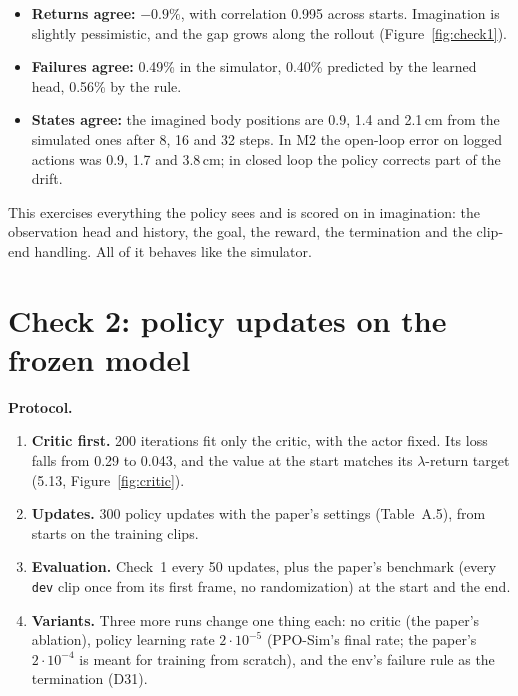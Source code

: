 \documentclass[10pt]{article}
\newcommand{\fig}[1]{Figure~\ref{#1}}
\begin{document}
\begin{itemize}
  \item \textbf{Returns agree:} $-0.9\%$, with correlation 0.995 across starts. Imagination is slightly
  pessimistic, and the gap grows along the rollout (\fig{fig:check1}).
  \item \textbf{Failures agree:} 0.49\% in the simulator, 0.40\% predicted by the learned head, 0.56\%
  by the rule.
  \item \textbf{States agree:} the imagined body positions are 0.9, 1.4 and 2.1\,cm from the simulated
  ones after 8, 16 and 32 steps. In M2 the open-loop error on logged actions was 0.9, 1.7 and 3.8\,cm;
  in closed loop the policy corrects part of the drift.
\end{itemize}

This exercises everything the policy sees and is scored on in imagination: the observation head
and history, the goal, the reward, the termination and the clip-end handling. All of it behaves like
the simulator.

\section{Check 2: policy updates on the frozen model}

\textbf{Protocol.}
\begin{enumerate}
  \item \textbf{Critic first.} 200 iterations fit only the critic, with the actor fixed. Its loss falls
  from 0.29 to 0.043, and the value at the start matches its $\lambda$-return target (5.13,
  \fig{fig:critic}).
  \item \textbf{Updates.} 300 policy updates with the paper's settings (Table~A.5), from starts on the
  training clips.
  \item \textbf{Evaluation.} Check~1 every 50 updates, plus the paper's benchmark (every \texttt{dev}
  clip once from its first frame, no randomization) at the start and the end.
  \item \textbf{Variants.} Three more runs change one thing each: no critic (the paper's ablation),
  policy learning rate $2\cdot10^{-5}$ (PPO-Sim's final rate; the paper's $2\cdot10^{-4}$ is meant
  for training from scratch), and the env's failure rule as the termination (D31).
\end{enumerate}

\begin{table}[H]
\centering\small
\caption{Check 2: the policy before and after 300 updates on the frozen model. Benchmark: every
\texttt{dev} clip from its first frame. Closed loop: check~1 after the last update. Worst gap: the
largest imagined-vs-simulated return gap over the evaluations.}
\label{tab:update}
\setlength{\tabcolsep}{4pt}
\resizebox{\textwidth}{!}{}
\end{table}
\end{document}
